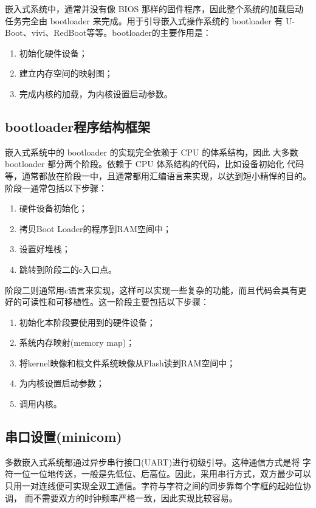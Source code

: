 	嵌入式系统中，通常并没有像 BIOS 那样的固件程序，因此整个系统的加载启动
任务完全由 bootloader 来完成。用于引导嵌入式操作系统的 bootloader 有
U-Boot、vivi、RedBoot等等。bootloader的主要作用是：
\begin{enumerate}\itemsep=-3pt
  \item 初始化硬件设备；
  \item 建立内存空间的映射图；
  \item 完成内核的加载，为内核设置启动参数。
\end{enumerate}

\subsection{bootloader程序结构框架}
	嵌入式系统中的 bootloader 的实现完全依赖于 CPU 的体系结构，因此
大多数 bootloader 都分两个阶段。依赖于 CPU 体系结构的代码，比如设备初始化
代码等，通常都放在阶段一中，且通常都用汇编语言来实现，以达到短小精悍的目的。
阶段一通常包括以下步骤：
\begin{enumerate}\itemsep=-5pt
  \item 硬件设备初始化；
  \item 拷贝Boot Loader的程序到RAM空间中；
  \item 设置好堆栈；
  \item 跳转到阶段二的c入口点。
\end{enumerate}

	阶段二则通常用c语言来实现，这样可以实现一些复杂的功能，而且代码会具有更好的可读性和可移植性。这一阶段主要包括以下步骤：
\begin{enumerate}\itemsep=-3pt
  \item 初始化本阶段要使用到的硬件设备；
  \item 系统内存映射(memory map)；
  \item 将kernel映像和根文件系统映像从Flash读到RAM空间中； 
  \item 为内核设置启动参数；
  \item 调用内核。
\end{enumerate}

\subsection{串口设置(minicom)}
    多数嵌入式系统都通过异步串行接口(UART)进行初级引导。这种通信方式是将
字符一位一位地传送，一般是先低位、后高位。因此，采用串行方式，双方最少可以
只用一对连线便可实现全双工通信。字符与字符之间的同步靠每个字框的起始位协调，
而不需要双方的时钟频率严格一致，因此实现比较容易。

